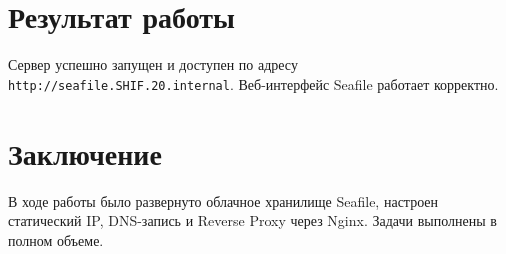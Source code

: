 \documentclass[a4paper,14pt,oneside,openany]{memoir}
\begin{document}
\section{Результат работы}

Сервер успешно запущен и доступен по адресу \texttt{http://seafile.SHIF.20.internal}. Веб-интерфейс Seafile работает корректно.

\section*{Заключение}

В ходе работы было развернуто облачное хранилище Seafile, настроен статический IP, DNS-запись и Reverse Proxy через Nginx. Задачи выполнены в полном объеме.
\end{document}
